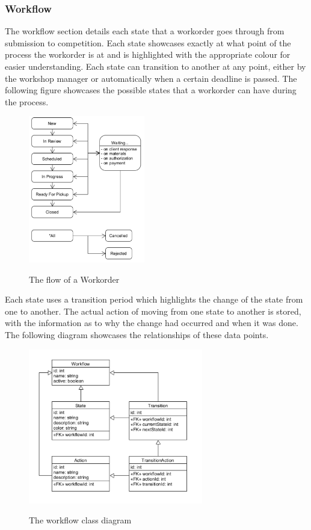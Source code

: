 {{{{{{{\subsubsection{Workflow}
The workflow section details each state that a workorder goes through from submission to competition. Each state showcases exactly at what point of the process the workorder is at and is highlighted with the appropriate colour for easier understanding. Each state can transition to another at any point, either by the workshop manager or automatically when a certain deadline is passed. The following figure showcases the possible states that a workorder can have during the process. 
\begin{figure}[H]
	\centering
	\includegraphics[width=2in]{workflow-diagram.png}\\
	\caption{The flow of a Workorder}
	\label{fig:tobias}
\end{figure}
\newpage
Each state uses a transition period which highlights the change of the state from one to another. The actual action of moving from one state to another is stored, with the information as to why the change had occurred and when it was done. The following diagram showcases the relationships of these data points. 
\begin{figure}[H]
	\centering
	\includegraphics[width=3in]{workflow-class.png}\\
	\caption{The workflow class diagram}
	\label{fig:tobias}
\end{figure}
\newpage
}}}}}}}
